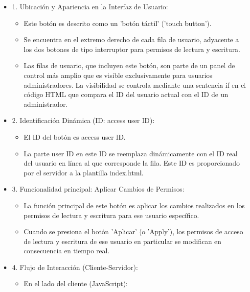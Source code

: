\documentclass{report}
\begin{document}
\begin{itemize}
    \item 1. Ubicación y Apariencia en la Interfaz de Usuario:
        \begin{itemize}
            \item Este botón es descrito como un 'botón táctil' ('touch button').
            \item Se encuentra en el extremo derecho de cada fila de usuario, adyacente a los dos botones de tipo interruptor para 
            permisos de lectura y escritura.
            \item Las filas de usuario, que incluyen este botón, son parte de un panel de control más amplio que es visible exclusivamente 
            para usuarios administradores. La visibilidad se controla mediante una sentencia if en el código HTML que compara el ID del 
            usuario actual con el ID de un administrador.        
        \end{itemize}
    \item 2. Identificación Dinámica (ID: access user ID):
        \begin{itemize}
            \item El ID del botón es access user ID.
            \item La parte user ID en este ID se reemplaza dinámicamente con el ID real del usuario en línea al que corresponde la fila. 
            Este ID es proporcionado por el servidor a la plantilla index.html.        
        \end{itemize}
    \item 3. Funcionalidad principal: Aplicar Cambios de Permisos:
        \begin{itemize}
            \item La función principal de este botón es aplicar los cambios realizados en los permisos de lectura y escritura para ese 
            usuario específico.
            \item Cuando se presiona el botón 'Aplicar' (o 'Apply'), los permisos de acceso de lectura y escritura de ese usuario en 
            particular se modifican en consecuencia en tiempo real.        
        \end{itemize}
    \item 4. Flujo de Interacción (Cliente-Servidor):
        \begin{itemize}
            \item En el lado del cliente (JavaScript):
                \begin{itemize}

\end{itemize}
\end{itemize}
\end{itemize}
\end{document}
